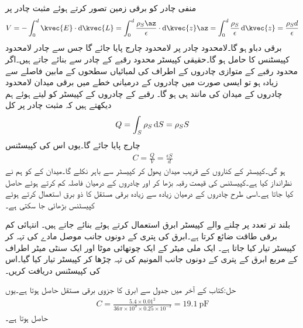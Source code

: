 منفی چادر کو برقی زمین تصور کرتے ہوئے مثبت چادر پر
\begin{align*}
V=-\int_0^d \kvec{E} \cdot \dif \kvec{L}=\int_0^d \frac{\rho_S \az}{\epsilon} \cdot \dif \kvec{z} \az=\int_0^d \frac{\rho_S }{\epsilon}  \dif \kvec{z}=\frac{\rho_S d}{\epsilon}
\end{align*}
برقی دباو ہو گا۔لامحدود چادر پر لامحدود چارج پایا جائے گا جس سے چادر لامحدود کپیسٹنس کا حامل ہو گا۔حقیقی کپیسٹر محدود رقبے کے چادر سے بنائے جاتے ہیں۔اگر محدود رقبے کے متوازی چادروں کے اطراف کی لمبائیاں سطحوں کے مابین فاصلے سے زیادہ ہو تو ایسی صورت میں چادروں کے درمیانی خطے میں برقی میدان  لامحدود چادروں کے میدان کی مانند ہی ہو گا۔  رقبے کے چادروں کے کپیسٹر کو لیتے ہوئے ہم دیکھتے ہیں کہ مثبت چادر پر کل
\begin{align*}
Q=\int_S \rho_S \dif S=\rho_S S
\end{align*}
چارج پایا جائے  گا۔یوں اس کی کپیسٹنس
\begin{align}\label{مساوات_کپیسٹر_دو_چادر_کپیسٹر}
C=\frac{Q}{V}=\frac{\epsilon S}{d}
\end{align}
ہو گی۔کپیسٹر کے کناروں کے قریب میدان پھول کر کپیسٹر سے باہر نکلے گا۔میدان کے  کو ہم نے نظرانداز کیا ہے۔کپیسٹنس کی قیمت رقبہ بڑھا کر اور چادروں کے درمیان فاصلہ کم کرتے ہوئے حاصل کیا جاتا ہے۔اسی طرح چادروں کے درمیان زیادہ سے زیادہ برقی مستقل کا ذو برق استعمال کرتے ہوئے کپیسٹنس بڑھائی جا سکتی ہے۔

بلند تر تعدد پر چلنے والے کپیسٹر ابرق استعمال کرتے ہوئے بنائے جاتے ہیں۔ انتہائی کم برقی طاقت ضائع کرتا ہے۔ابرق کی پتری کے دونوں جانب موصل مادے کی تہہ  کر کپیسٹر تیار کیا جاتا ہے۔
ایک ملی میٹر کے ایک چوتھائی موٹا اور ایک سنٹی میٹر اطراف کے مربع ابرق کے پتری کے دونوں جانب المونیم کی تہہ چڑھا کر کپیسٹر تیار کیا گیا۔اس کی کپیسٹنس دریافت کریں۔

حل:کتاب کے آخر میں جدول  سے ابرق کا جزوی برقی مستقل  حاصل ہوتا ہے۔یوں
\begin{align*}
C=\frac{5.4 \times 0.01^2}{36 \pi \times 10^9 \times 0.25 \times 10^{-3}}=\SI{19.1}{\pico \farad}
\end{align*}
حاصل ہوتا ہے۔

